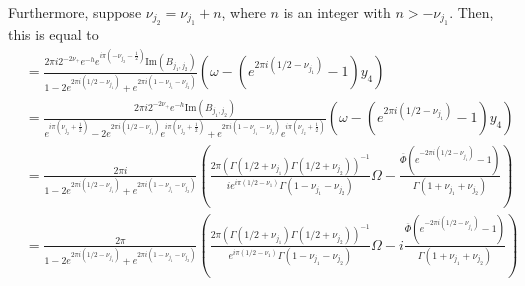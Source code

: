 \documentclass[11pt]{article}
\begin{document}
Furthermore, suppose $\nu_{j_2} = \nu_{j_1} + n$, where $n$ is an integer with $n> -\nu_{j_1}$. Then, this is equal to  \begin{align*}
&=\frac{2\pi i 2^{-2\nu_+}e^{-h}  e^{i \pi (-\nu_{j_2} - \frac12) }\textrm{Im}(B_{j_1, j_2})}{1 - 2e^{2 \pi i (1/2 - \nu_{j_1})} + e^{2 \pi i (1 - \nu_{j_1}-\nu_{j_2})}}\left(\omega - (e^{2 \pi i (1/2 - \nu_{j_1})}- 1) y_4\right) \\
&=\frac{2\pi i 2^{-2\nu_+}e^{-h} \textrm{Im}(B_{j_1, j_2})}{e^{i \pi (\nu_{j_2} + \frac12) } - 2e^{2 \pi i (1/2 - \nu_{j_1})}e^{i \pi (\nu_{j_2} + \frac12) } + e^{2 \pi i (1 - \nu_{j_1}-\nu_{j_2})}e^{i \pi (\nu_{j_2} +\frac12) }}\left(\omega - (e^{2 \pi i (1/2 - \nu_{j_1})}- 1) y_4\right) \\
&= \frac{2\pi i}{1 - 2e^{2 \pi i (1/2 - \nu_{j_1})} + e^{2 \pi i (1 - \nu_{j_1}-\nu_{j_2})}}\left(\frac{2 \pi(\Gamma(1/2+ \nu_{j_1})\Gamma(1/2 + \nu_{j_2}))^{-1} }{ie^{i \pi (1/2- \nu_1)}\Gamma(1 - \nu_{j_1} - \nu_{j_2})}\Omega -  \frac{\overline{\Phi}(e^{-2 \pi i (1/2 - \nu_{j_1})}- 1)}{\Gamma(1 + \nu_{j_1} + \nu_{j_2})}\right) \\
&= \frac{2\pi}{1 - 2e^{2 \pi i (1/2 - \nu_{j_1})} + e^{2 \pi i (1 - \nu_{j_1}-\nu_{j_2})}}\left(\frac{2 \pi(\Gamma(1/2+ \nu_{j_1})\Gamma(1/2 + \nu_{j_2}))^{-1} }{e^{i \pi (1/2- \nu_1)}\Gamma(1 - \nu_{j_1} - \nu_{j_2})}\Omega -  i\frac{\overline{\Phi}(e^{-2 \pi i (1/2 - \nu_{j_1})}- 1)}{\Gamma(1 + \nu_{j_1} + \nu_{j_2})}\right) 
\end{align*}

\pagebreak 
\end{document}
